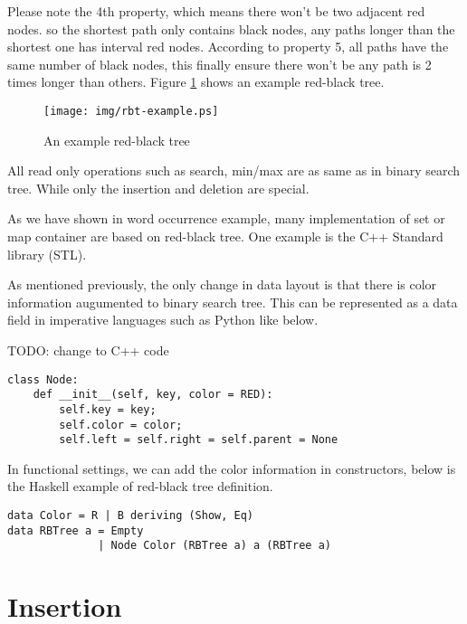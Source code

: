 \documentclass{article}
\begin{document}
Please note the 4th property, which means there won't be two adjacent 
red nodes. so the shortest path only contains black nodes, any paths 
longer than the shortest one has interval red nodes. According to 
property 5, all paths have the same number of black nodes, 
this finally ensure there won't be any path is 2 times longer than 
others\cite{wiki}. Figure \ref{fig:rbt-example} shows an example
red-black tree.

\begin{figure}[htbp]
       \begin{center}
	\texttt{[image: img/rbt-example.ps]}
        \caption{An example red-black tree} \label{fig:rbt-example}
       \end{center}
\end{figure}

All read only operations such as search, min/max are as same as in 
binary search tree. While only the insertion and deletion are special.

As we have shown in word occurrence example, many implementation of 
set or map container are based on red-black tree. One example is the 
C++ Standard library (STL)\cite{sgi-stl}. 

As mentioned previously, the only change in data layout is that
there is color information augumented to binary search tree.
This can be represented as a data field in imperative languages
such as Python like below.

TODO: change to C++ code

\lstset{language=Python}
\begin{lstlisting}
class Node:
    def __init__(self, key, color = RED):
        self.key = key;
        self.color = color;
        self.left = self.right = self.parent = None
\end{lstlisting}

In functional settings, we can add the color information
in constructors, below is the Haskell example of red-black tree
definition.

\lstset{language=Haskell}
\begin{lstlisting}
data Color = R | B deriving (Show, Eq) 
data RBTree a = Empty
              | Node Color (RBTree a) a (RBTree a)
\end{lstlisting}

\section{Insertion}
\end{document}
